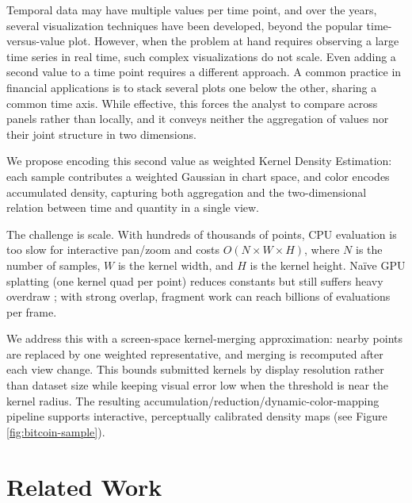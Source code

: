 \documentclass[10pt,conference]{IEEEtran}
\begin{document}

Temporal data may have multiple values per time point, and over the years, several visualization techniques have been developed, beyond the popular time-versus-value plot. However, when the problem at hand requires observing a large time series in real time, such complex visualizations do not scale. Even adding a second value to a time point requires a different approach. A common practice in financial applications is to stack several plots one below the other, sharing a common time axis. While effective, this forces the analyst to compare across panels rather than locally, and it conveys neither the aggregation of values nor their joint structure in two dimensions.

We propose encoding this second value as weighted Kernel Density Estimation: each sample contributes a weighted Gaussian in chart space, and color encodes accumulated density, capturing both aggregation and the two-dimensional relation between time and quantity in a single view.

The challenge is scale. With hundreds of thousands of points, CPU evaluation is too slow for interactive pan/zoom and costs $O(N \times W \times H)$, where $N$ is the number of samples, $W$ is the kernel width, and $H$ is the kernel height. Na\"{i}ve GPU splatting (one kernel quad per point) reduces constants but still suffers heavy overdraw \cite{10.1109/TVCG.2013.65}; with strong overlap, fragment work can reach billions of evaluations per frame.

We address this with a screen-space kernel-merging approximation: nearby points are replaced by one weighted representative, and merging is recomputed after each view change. This bounds submitted kernels by display resolution rather than dataset size while keeping visual error low when the threshold is near the kernel radius. The resulting accumulation/reduction/dynamic-color-mapping pipeline supports interactive, perceptually calibrated density maps (see Figure \ref{fig:bitcoin-sample}).

\section{Related Work}
\label{sec:related-work}
\end{document}
